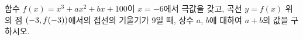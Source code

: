 함수 $f(x)=x^3+ax^2+bx+100$이 $x=-6$에서 극값을 갖고, 곡선 $y=f(x)$ 위의 점 $(-3{,}\mkern3mu\mathopen{}f(-3))$에서의 접선의 기울기가 $9$일 때, 상수 $a$, $b$에 대하여 $a+b$의 값을 구하시오.
